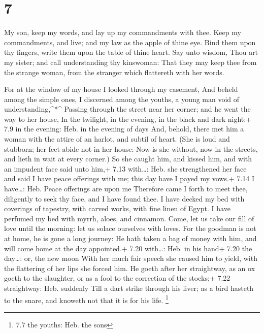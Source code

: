 \hypertarget{section-6}{%
\section{7}\label{section-6}}

 My son, keep my words, and lay up my commandments with
thee.  Keep my commandments, and live; and my law as the
apple of thine eye.  Bind them upon thy fingers, write them
upon the table of thine heart.  Say unto wisdom, Thou art my
sister; and call understanding thy kinswoman:  That they may
keep thee from the strange woman, from the stranger which flattereth
with her words.

 For at the window of my house I looked through my casement,
 And beheld among the simple ones, I discerned among the
youths, a young man void of understanding,\^{}*\^{}  Passing
through the street near her corner; and he went the way to her house,
 In the twilight, in the evening, in the black and dark
night:+ 7.9 in the evening: Heb. in the evening of days 
And, behold, there met him a woman with the attire of an harlot, and
subtil of heart.  (She is loud and stubborn; her feet abide
not in her house:  Now is she without, now in the streets,
and lieth in wait at every corner.)  So she caught him, and
kissed him, and with an impudent face said unto him,+ 7.13 with\ldots:
Heb. she strengthened her face and said  I have peace
offerings with me; this day have I payed my vows.+ 7.14 I have\ldots:
Heb. Peace offerings are upon me  Therefore came I forth to
meet thee, diligently to seek thy face, and I have found thee.
 I have decked my bed with coverings of tapestry, with
carved works, with fine linen of Egypt.  I have perfumed my
bed with myrrh, aloes, and cinnamon.  Come, let us take our
fill of love until the morning: let us solace ourselves with loves.
 For the goodman is not at home, he is gone a long journey:
 He hath taken a bag of money with him, and will come home
at the day appointed.+ 7.20 with\ldots: Heb. in his hand+ 7.20 the
day\ldots: or, the new moon  With her much fair speech she
caused him to yield, with the flattering of her lips she forced him.
 He goeth after her straightway, as an ox goeth to the
slaughter, or as a fool to the correction of the stocks;+ 7.22
straightway: Heb. suddenly  Till a dart strike through his
liver; as a bird hasteth to the snare, and knoweth not that it is for
his life. \footnote{7.7 the youths: Heb. the sons}

